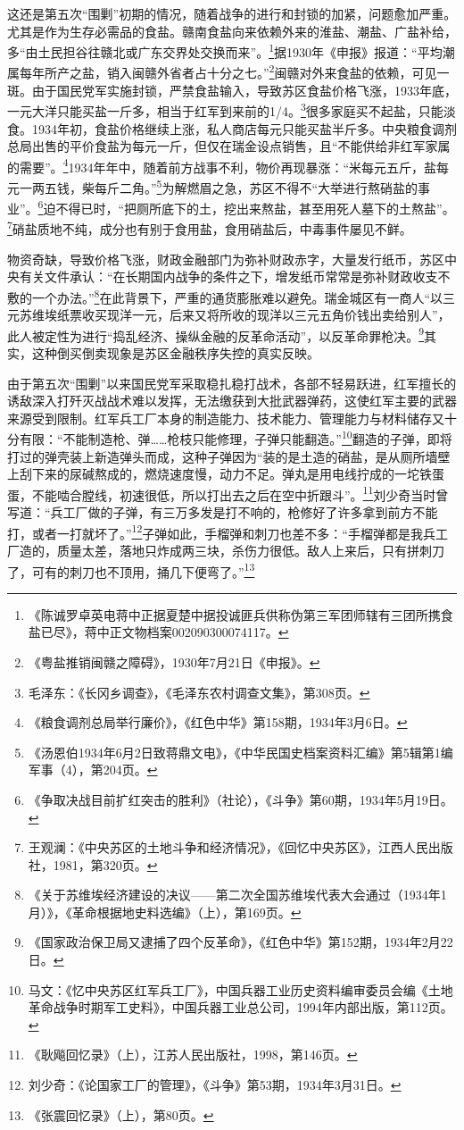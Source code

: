 这还是第五次“围剿”初期的情况，随着战争的进行和封锁的加紧，问题愈加严重。尤其是作为生存必需品的食盐。赣南食盐向来依赖外来的淮盐、潮盐、广盐补给，多“由土民担谷往赣北或广东交界处交换而来”。\footnote{《陈诚罗卓英电蒋中正据夏楚中据投诚匪兵供称伪第三军团师辖有三团所携食盐已尽》，蒋中正文物档案002090300074117。}据1930年《申报》报道：“平均潮属每年所产之盐，销入闽赣外省者占十分之七。”\footnote{《粤盐推销闽赣之障碍》，1930年7月21日《申报》。}闽赣对外来食盐的依赖，可见一斑。由于国民党军实施封锁，严禁食盐输入，导致苏区食盐价格飞涨，1933年底，一元大洋只能买盐一斤多，相当于红军到来前的1/4。\footnote{毛泽东：《长冈乡调查》，《毛泽东农村调查文集》，第308页。}很多家庭买不起盐，只能淡食。1934年初，食盐价格继续上涨，私人商店每元只能买盐半斤多。中央粮食调剂总局出售的平价食盐为每元一斤，但仅在瑞金设点销售，且“不能供给非红军家属的需要”。\footnote{《粮食调剂总局举行廉价》，《红色中华》第158期，1934年3月6日。}1934年年中，随着前方战事不利，物价再现暴涨：“米每元五斤，盐每元一两五钱，柴每斤二角。”\footnote{《汤恩伯1934年6月2日致蒋鼎文电》，《中华民国史档案资料汇编》第5辑第1编军事（4），第204页。}为解燃眉之急，苏区不得不“大举进行熬硝盐的事业”。\footnote{《争取决战目前扩红突击的胜利》（社论），《斗争》第60期，1934年5月19日。}迫不得已时，“把厕所底下的土，挖出来熬盐，甚至用死人墓下的土熬盐”。\footnote{王观澜：《中央苏区的土地斗争和经济情况》，《回忆中央苏区》，江西人民出版社，1981，第320页。}硝盐质地不纯，成分也有别于食用盐，食用硝盐后，中毒事件屡见不鲜。


物资奇缺，导致价格飞涨，财政金融部门为弥补财政赤字，大量发行纸币，苏区中央有关文件承认：“在长期国内战争的条件之下，增发纸币常常是弥补财政收支不敷的一个办法。”\footnote{《关于苏维埃经济建设的决议——第二次全国苏维埃代表大会通过（1934年1月）》，《革命根据地史料选编》（上），第169页。}在此背景下，严重的通货膨胀难以避免。瑞金城区有一商人“以三元苏维埃纸票收买现洋一元，后来又将所收的现洋以三元五角价钱出卖给别人”，此人被定性为进行“捣乱经济、操纵金融的反革命活动”，以反革命罪枪决。\footnote{《国家政治保卫局又逮捕了四个反革命》，《红色中华》第152期，1934年2月22日。}其实，这种倒买倒卖现象是苏区金融秩序失控的真实反映。


由于第五次“围剿”以来国民党军采取稳扎稳打战术，各部不轻易跃进，红军擅长的诱敌深入打歼灭战战术难以发挥，无法缴获到大批武器弹药，这使红军主要的武器来源受到限制。红军兵工厂本身的制造能力、技术能力、管理能力与材料储存又十分有限：“不能制造枪、弹……枪枝只能修理，子弹只能翻造。”\footnote{马文：《忆中央苏区红军兵工厂》，中国兵器工业历史资料编审委员会编《土地革命战争时期军工史料》，中国兵器工业总公司，1994年内部出版，第112页。}翻造的子弹，即将打过的弹壳装上新造弹头而成，这种子弹因为“装的是土造的硝盐，是从厕所墙壁上刮下来的尿碱熬成的，燃烧速度慢，动力不足。弹丸是用电线拧成的一坨铁蛋蛋，不能啮合膛线，初速很低，所以打出去之后在空中折跟斗”。\footnote{《耿飚回忆录》（上），江苏人民出版社，1998，第146页。}刘少奇当时曾写道：“兵工厂做的子弹，有三万多发是打不响的，枪修好了许多拿到前方不能打，或者一打就坏了。”\footnote{刘少奇：《论国家工厂的管理》，《斗争》第53期，1934年3月31日。}子弹如此，手榴弹和刺刀也差不多：“手榴弹都是我兵工厂造的，质量太差，落地只炸成两三块，杀伤力很低。敌人上来后，只有拼刺刀了，可有的刺刀也不顶用，捅几下便弯了。”\footnote{《张震回忆录》（上），第80页。}


